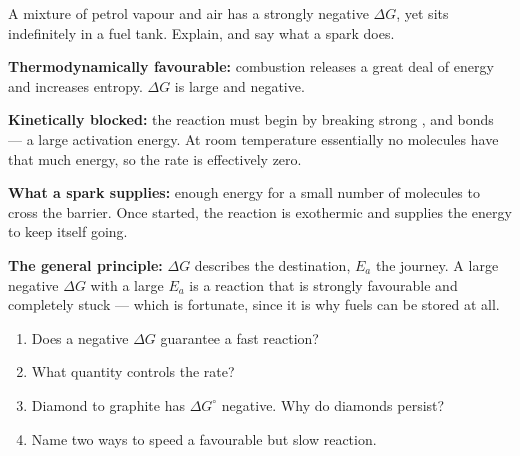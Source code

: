 \documentclass{apchem-worksheet}
\begin{document}
\begin{workedexample}
A mixture of petrol vapour and air has a strongly negative
$\Delta G$, yet sits indefinitely in a fuel tank. Explain, and say what a
spark does.

\textbf{Thermodynamically favourable:} combustion releases a great deal of
energy and increases entropy. $\Delta G$ is large and negative.

\textbf{Kinetically blocked:} the reaction must begin by breaking strong
,  and  bonds --- a large activation energy. At
room temperature essentially no molecules have that much energy, so the
rate is effectively zero.

\textbf{What a spark supplies:} enough energy for a small number of
molecules to cross the barrier. Once started, the reaction is exothermic
and supplies the energy to keep itself going.

\textbf{The general principle:} $\Delta G$ describes the destination,
$E_a$ the journey. A large negative $\Delta G$ with a large $E_a$ is a
reaction that is strongly favourable and completely stuck --- which is
fortunate, since it is why fuels can be stored at all.
\end{workedexample}

\begin{yourturn}
\begin{enumerate}[leftmargin=*,itemsep=0.5em]
  \item Does a negative $\Delta G$ guarantee a fast reaction?
        \workspace[1.4cm]
  \item What quantity controls the rate? \workspace[1.4cm]
  \item Diamond to graphite has $\Delta G^\circ$ negative. Why do diamonds
        persist? \workspace[1.8cm]
  \item Name two ways to speed a favourable but slow reaction.
        \workspace[1.6cm]
\end{enumerate}
\end{yourturn}
\end{document}
